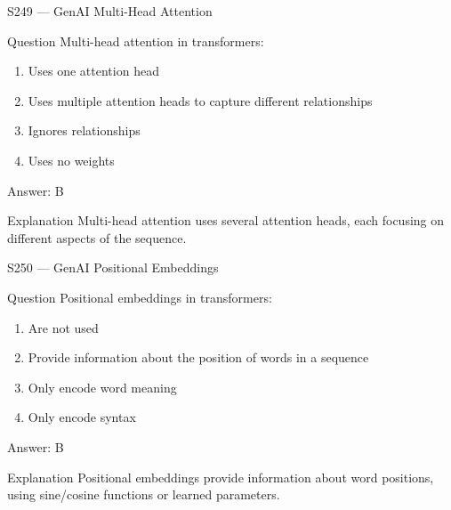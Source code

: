 \documentclass[aspectratio=169,8pt]{beamer}
\begin{document}
	\begin{frame}{S249 --- GenAI Multi-Head Attention}
		\begin{block}{Question}
			Multi-head attention in transformers:
			\begin{enumerate}
				\item Uses one attention head
				\item Uses multiple attention heads to capture different relationships
				\item Ignores relationships
				\item Uses no weights
			\end{enumerate}
		\end{block}
		\begin{exampleblock}{Answer: B}\end{exampleblock}
		\begin{block}{Explanation}
			Multi-head attention uses several attention heads, each focusing on different aspects of the sequence.
		\end{block}
	\end{frame}
	
	\begin{frame}{S250 --- GenAI Positional Embeddings}
		\begin{block}{Question}
			Positional embeddings in transformers:
			\begin{enumerate}
				\item Are not used
				\item Provide information about the position of words in a sequence
				\item Only encode word meaning
				\item Only encode syntax
			\end{enumerate}
		\end{block}
		\begin{exampleblock}{Answer: B}\end{exampleblock}
		\begin{block}{Explanation}
			Positional embeddings provide information about word positions, using sine/cosine functions or learned parameters.
		\end{block}
	\end{frame}
	
\end{document}
